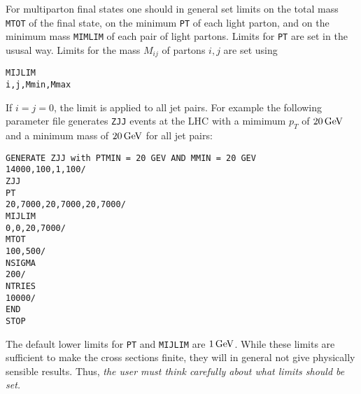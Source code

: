       For multiparton final states one should in general set limits
on the total mass \verb|MTOT| of the final state, on the minimum
\verb|PT| of each light parton, and on the minimum mass \verb|MIMLIM|
of each pair of light partons. Limits for \verb|PT| are set in the
ususal way. Limits for the mass $M_{ij}$ of partons $i,j$ are set using
\begin{verbatim}
MIJLIM
i,j,Mmin,Mmax
\end{verbatim}
If $i=j=0$, the limit is applied to all jet pairs. For example the
following parameter file generates \verb|ZJJ| events at the LHC with a
mimimum $p_T$ of $20\,{\rm GeV}$ and a minimum mass of $20\,{\rm GeV}$ for all
jet pairs:
\begin{verbatim}
GENERATE ZJJ with PTMIN = 20 GEV AND MMIN = 20 GEV
14000,100,1,100/
ZJJ
PT
20,7000,20,7000,20,7000/
MIJLIM
0,0,20,7000/
MTOT
100,500/
NSIGMA
200/
NTRIES
10000/
END
STOP
\end{verbatim}
The default lower limits for \verb|PT| and \verb|MIJLIM| are
$1\,{\rm GeV}$. While these limits are sufficient to make the cross
sections finite, they will in general not give physically sensible
results. Thus, {\it the user must think carefully about what limits
should be set.}
